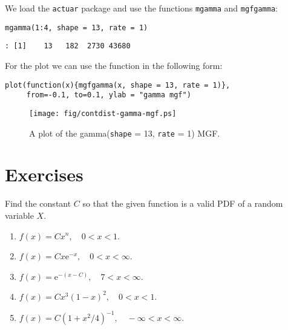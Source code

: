 We load the \texttt{actuar} package and use the functions \texttt{mgamma} and
\texttt{mgfgamma}:
\begin{verbatim}
mgamma(1:4, shape = 13, rate = 1)
\end{verbatim}

\begin{verbatim}
: [1]    13   182  2730 43680
\end{verbatim}

For the plot we can use the function in the following form:

\begin{verbatim}
plot(function(x){mgfgamma(x, shape = 13, rate = 1)}, 
     from=-0.1, to=0.1, ylab = "gamma mgf")
\end{verbatim}

\begin{figure}[ht!]
\centering
\texttt{[image: fig/contdist-gamma-mgf.ps]}
\caption[Plot of the \textsf{gamma}(\texttt{shape} = 13, \texttt{rate} = 1) MGF]{\label{fig-gamma-mgf}\small A plot of the \textsf{gamma}(\texttt{shape} = 13, \texttt{rate} = 1) MGF.}
\end{figure}



\newpage{}

\section{Exercises}
\label{sec-6-6}
\setcounter{thm}{0}

\begin{xca}
Find the constant \(C\) so that the given function is a valid PDF of a random variable \(X\).
\begin{enumerate}
\item \( f(x) = Cx^{n},\quad 0 < x <1 \).
\item \( f(x) = Cx\mathrm{e}^{-x},\quad 0 < x < \infty\).
\item \( f(x) = \mathrm{e}^{-(x - C)}, \quad 7 < x < \infty.\)
\item \( f(x) = Cx^{3}(1 - x)^{2},\quad 0 < x < 1.\)
\item \( f(x) = C(1 + x^{2}/4)^{-1}, \quad -\infty < x < \infty.\)
\end{enumerate}
\end{xca}

